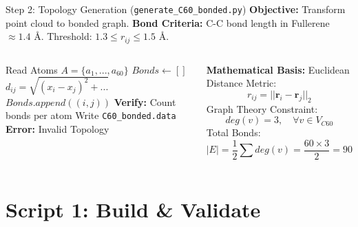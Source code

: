 \documentclass[aspectratio=169, 10pt]{beamer}
\begin{document}
\begin{frame}[fragile]{Step 2: Topology Generation (\texttt{generate\_C60\_bonded.py})}
    \textbf{Objective:} Transform point cloud to bonded graph.
    \textbf{Bond Criteria:} C-C bond length in Fullerene $\approx 1.4$ \AA. Threshold: $1.3 \le r_{ij} \le 1.5$ \AA.

    \begin{columns}
    \begin{algorithmic}[1]
        \State Read Atoms $A = \{a_1, ..., a_{60}\}$
        \State $Bonds \leftarrow []$
                \State $d_{ij} = \sqrt{(x_i-x_j)^2 + ...}$
                    \State $Bonds.append((i, j))$
                \EndIf
            \EndFor
        \EndFor
        \State \textbf{Verify:} Count bonds per atom
            \State Write \texttt{C60\_bonded.data}
        \Else
            \State \textbf{Error:} Invalid Topology
        \EndIf
    \end{algorithmic}
    
    \textbf{Mathematical Basis:}
    Euclidean Distance Metric:
    \begin{equation}
        r_{ij} = ||\mathbf{r}_i - \mathbf{r}_j||_2
    \end{equation}
    Graph Theory Constraint:
    \begin{equation}
        deg(v) = 3, \quad \forall v \in V_{C60}
    \end{equation}
    Total Bonds:
    \begin{equation}
        |E| = \frac{1}{2} \sum deg(v) = \frac{60 \times 3}{2} = 90
    \end{equation}
    \end{columns}
\end{frame}

\section{Script 1: Build \& Validate}
\end{document}

